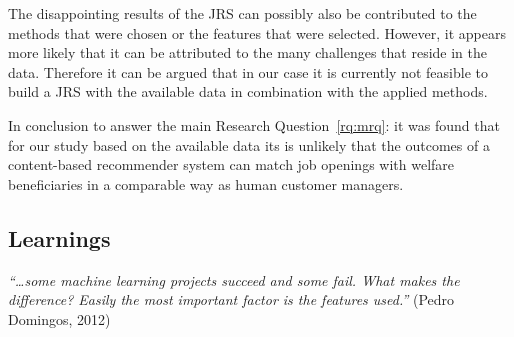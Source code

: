 The disappointing results of the JRS can possibly also be contributed to the methods that were chosen or the features that were selected. 
However, it appears more likely that it can be attributed to the many challenges that reside in the data.
Therefore it can be argued that in our case it is currently not feasible to build a JRS with the available data in combination with the applied methods. 

In conclusion to answer the main Research Question~\ref{rq:mrq}: it was found that for our study based on the available data its is unlikely that the outcomes of a content-based recommender system can match job openings with welfare beneficiaries in a comparable way as human customer managers. 
\subsection{Learnings}
\label{ssec:learnings}

\textit{“…some machine learning projects succeed and some fail. What makes the difference?  Easily the most important factor is the features used.”} (Pedro Domingos, 2012) \nocite{domingos2012few}



